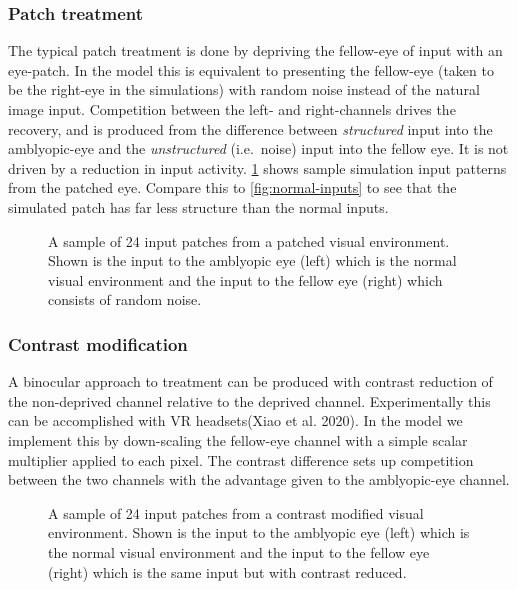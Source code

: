 \documentclass[
  sn-apa,
  pdflatex]{sn-jnl}
\theoremstyle{thmstyleone}%
\theoremstyle{thmstyletwo}%
\theoremstyle{thmstylethree}%
\begin{document}
\hypertarget{patch-treatment}{%
\subsubsection{Patch treatment}\label{patch-treatment}}

The typical patch treatment is done by depriving the fellow-eye of input
with an eye-patch. In the model this is equivalent to presenting the
fellow-eye (taken to be the right-eye in the simulations) with random
noise instead of the natural image input. Competition between the left-
and right-channels drives the recovery, and is produced from the
difference between \emph{structured} input into the amblyopic-eye and
the \emph{unstructured} (i.e.~noise) input into the fellow eye. It is
not driven by a reduction in input activity. \ref{fig:patch-inputs}
shows sample simulation input patterns from the patched eye. Compare
this to \ref{fig:normal-inputs} to see that the simulated patch has far
less structure than the normal inputs.

\begin{figure}
\hypertarget{fig:patch-inputs}{%
\centering

\caption{A sample of 24 input patches from a patched visual environment.
Shown is the input to the amblyopic eye (left) which is the normal
visual environment and the input to the fellow eye (right) which
consists of random noise.}\label{fig:patch-inputs}
}
\end{figure}

\hypertarget{contrast-modification}{%
\subsubsection{Contrast modification}\label{contrast-modification}}

A binocular approach to treatment can be produced with contrast
reduction of the non-deprived channel relative to the deprived channel.
Experimentally this can be accomplished with VR headsets(Xiao et al.
2020). In the model we implement this by down-scaling the fellow-eye
channel with a simple scalar multiplier applied to each pixel. The
contrast difference sets up competition between the two channels with
the advantage given to the amblyopic-eye channel.

\begin{figure}
\hypertarget{fig:contrast-modified-inputs}{%
\centering

\caption{A sample of 24 input patches from a contrast modified visual
environment. Shown is the input to the amblyopic eye (left) which is the
normal visual environment and the input to the fellow eye (right) which
is the same input but with contrast
reduced.}\label{fig:contrast-modified-inputs}
}
\end{figure}
\end{document}

